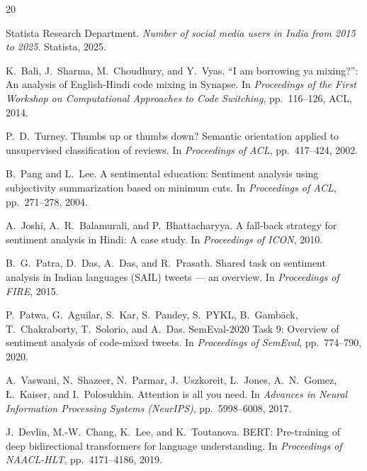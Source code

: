 \begin{thebibliography}{20}

Statista Research Department.
\newblock \textit{Number of social media users in India from 2015 to 2025}.
\newblock Statista, 2025.

K.\ Bali, J.\ Sharma, M.\ Choudhury, and Y.\ Vyas.
\newblock ``I am borrowing ya mixing?'': An analysis of English-Hindi code mixing in Synapse.
\newblock In \textit{Proceedings of the First Workshop on Computational Approaches to Code Switching}, pp.\ 116--126, ACL, 2014.

P.\ D.\ Turney.
\newblock Thumbs up or thumbs down? Semantic orientation applied to unsupervised classification of reviews.
\newblock In \textit{Proceedings of ACL}, pp.\ 417--424, 2002.

B.\ Pang and L.\ Lee.
\newblock A sentimental education: Sentiment analysis using subjectivity summarization based on minimum cuts.
\newblock In \textit{Proceedings of ACL}, pp.\ 271--278, 2004.

A.\ Joshi, A.\ R.\ Balamurali, and P.\ Bhattacharyya.
\newblock A fall-back strategy for sentiment analysis in Hindi: A case study.
\newblock In \textit{Proceedings of ICON}, 2010.

B.\ G.\ Patra, D.\ Das, A.\ Das, and R.\ Prasath.
\newblock Shared task on sentiment analysis in Indian languages (SAIL) tweets — an overview.
\newblock In \textit{Proceedings of FIRE}, 2015.

P.\ Patwa, G.\ Aguilar, S.\ Kar, S.\ Pandey, S.\ PYKL, B.\ Gambäck, T.\ Chakraborty, T.\ Solorio, and A.\ Das.
\newblock SemEval-2020 Task 9: Overview of sentiment analysis of code-mixed tweets.
\newblock In \textit{Proceedings of SemEval}, pp.\ 774--790, 2020.

A.\ Vaswani, N.\ Shazeer, N.\ Parmar, J.\ Uszkoreit, L.\ Jones, A.\ N.\ Gomez, Ł.\ Kaiser, and I.\ Polosukhin.
\newblock Attention is all you need.
\newblock In \textit{Advances in Neural Information Processing Systems (NeurIPS)}, pp.\ 5998--6008, 2017.

J.\ Devlin, M.-W.\ Chang, K.\ Lee, and K.\ Toutanova.
\newblock BERT: Pre-training of deep bidirectional transformers for language understanding.
\newblock In \textit{Proceedings of NAACL-HLT}, pp.\ 4171--4186, 2019.


\end{thebibliography}
